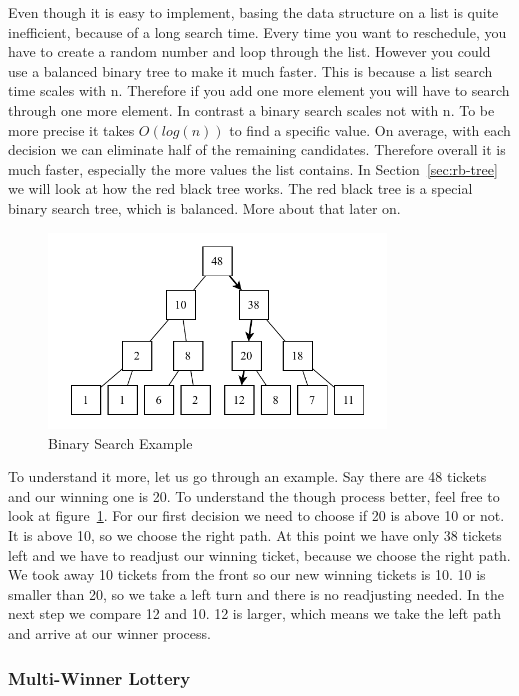 Even though it is easy to implement, basing the data structure on a list is quite inefficient, because of a long search time.
Every time you want to reschedule, you have to create a random number and loop through the list.
However you could use a balanced binary tree to make it much faster.
This is because a list search time scales with n. 
Therefore if you add one more element you will have to search through one more element.
In contrast a binary search scales not with n.
To be more precise it takes $O(log(n))$ to find a specific value.
On average, with each decision we can eliminate half of the remaining candidates.
Therefore overall it is much faster, especially the more values the list contains.
In Section~\ref{sec:rb-tree} we will look at how the red black tree works. The red black tree is a special binary search tree, which is balanced. More about that later on.

\begin{figure}[h]
    \centering
    \includegraphics[width=0.8\textwidth]{Assets/Binary-Search.pdf}
    \caption{Binary Search Example}
    \label{fig:binary-search}
\end{figure}

To understand it more, let us go through an example. Say there are 48 tickets and our winning one is 20.
To understand the though process better, feel free to look at figure~\ref{fig:binary-search}.
For our first decision we need to choose if 20 is above 10 or not.
It is above 10, so we choose the right path.
At this point we have only 38 tickets left and we have to readjust our winning ticket, because we choose the right path.
We took away 10 tickets from the front so our new winning tickets is 10.
10 is smaller than 20, so we take a left turn and there is no readjusting needed.
In the next step we compare 12 and 10.
12 is larger, which means we take the left path and arrive at our winner process.

\subsubsection{Multi-Winner Lottery}

